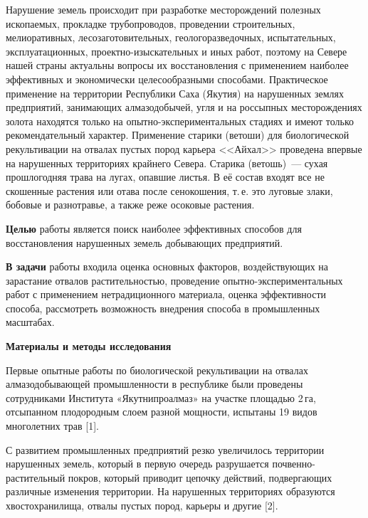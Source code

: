 
 



\makeProcTitle

Нарушение земель происходит при разработке месторождений полезных ископаемых, прокладке трубопроводов, проведении строительных, мелиоративных, лесозаготовительных, геологоразведочных, испытательных, эксплуатационных, проектно-изыскательных и иных работ, поэтому на Севере нашей страны актуальны вопросы их восстановления с применением наиболее эффективных и экономически целесообразными способами. Практическое применение на территории Республики Саха (Якутия) на нарушенных землях предприятий, занимающих алмазодобычей, угля и на россыпных месторождениях золота находятся только на опытно-экспериментальных стадиях и имеют только рекомендательный характер.  Применение старики (ветоши) для биологической рекультивации на отвалах пустых пород карьера <<Айхал>> проведена впервые на нарушенных территориях крайнего Севера. Старика (ветошь)~--- сухая прошлогодняя трава на лугах, опавшие листья. В её состав входят все не скошенные растения или отава после сенокошения, т.\,е. это луговые злаки, бобовые и разнотравье, а также реже осоковые растения.

\textbf{Целью} работы является поиск наиболее эффективных способов для восстановления нарушенных земель добывающих предприятий.

\textbf{В задачи} работы входила оценка основных факторов, воздействующих на зарастание отвалов растительностью, проведение опытно-экс\-пе\-ри\-мен\-таль\-ных работ с применением нетрадиционного материала, оценка эффективности способа, рассмотреть возможность внедрения способа в промышленных масштабах.

\textbf{Материалы и методы исследования}

Первые опытные работы по биологической рекультивации на отвалах алмазодобывающей промышленности в республике были проведены сотрудниками Института «Якутнипроалмаз» на участке площадью 2\,га, отсыпанном плодородным слоем разной мощности, испытаны 19 видов многолетних трав [1].

С развитием промышленных предприятий резко увеличилось территории нарушенных земель, который в первую очередь разрушается почвенно-растительный покров, который приводит цепочку действий, подвергающих различные изменения территории. На нарушенных территориях образуются хвостохранилища, отвалы пустых пород, карьеры и другие [2].

